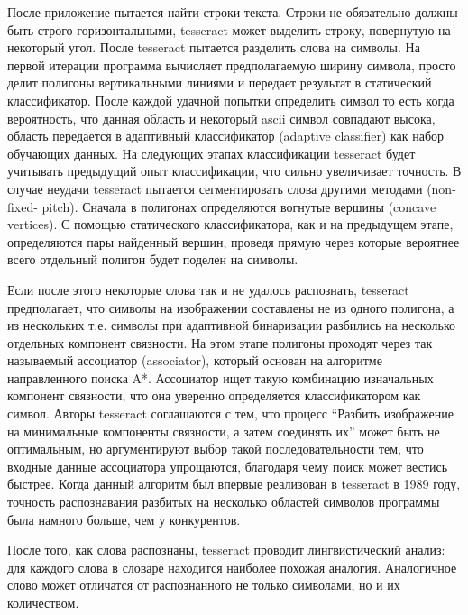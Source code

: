 \documentclass[oneside,final,14pt]{extreport}
\begin{document}
После приложение пытается найти строки текста. Строки не обязательно должны быть строго горизонтальными, tesseract может выделить строку, повернутую на некоторый угол. После tesseract пытается разделить слова на символы. На первой итерации программа вычисляет предполагаемую ширину символа, просто делит полигоны вертикальными линиями и передает результат в статический классификатор. После каждой удачной попытки определить символ то есть когда вероятность, что данная область и некоторый ascii символ совпадают высока, область передается в адаптивный классификатор (adaptive classifier)  как набор обучающих данных. На следующих этапах классификации tesseract будет учитывать предыдущий опыт классификации, что сильно увеличивает точность.  В случае неудачи tesseract пытается сегментировать слова другими методами (non-fixed-
pitch). Сначала в полигонах определяются вогнутые вершины (concave  vertices). С помощью статического классификатора, как и на предыдущем этапе, определяются пары найденный вершин, проведя прямую через которые вероятнее всего отдельный полигон будет поделен на символы. 


Если после этого некоторые слова так и не удалось распознать, tesseract предполагает, что символы на изображении составлены не из одного полигона, а из нескольких т.е. символы при адаптивной бинаризации разбились на несколько отдельных компонент связности. На этом этапе полигоны проходят через так называемый ассоциатор (associator), который основан на алгоритме направленного поиска A*. Ассоциатор ищет такую комбинацию изначальных компонент связности, что она уверенно определяется классификатором как символ. Авторы tesseract соглашаются с тем, что процесс “Разбить изображение на минимальные компоненты связности, а затем соединять их” может быть не оптимальным, но аргументируют выбор такой последовательности тем, что входные данные ассоциатора упрощаются, благодаря чему поиск может вестись быстрее. Когда данный алгоритм был впервые реализован в tesseract в 1989 году, точность распознавания разбитых на несколько областей символов программы была намного больше, чем у конкурентов.

После того, как слова распознаны, tesseract проводит лингвистический анализ: для каждого слова в словаре находится наиболее похожая аналогия. Аналогичное слово может отличатся от распознанного не только символами, но и их количеством.
\end{document}
